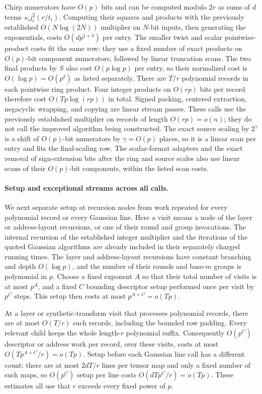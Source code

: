 \documentclass[11pt]{article}
\theoremstyle{definition}
\begin{document}
Chirp numerators have $O(p)$ bits and can be computed modulo $2r$ as
sums of $d$ terms $s_i j_i^2(r/t_i)$.  Computing their squares and
products with the previously established $O(N\log(2N))$ multiplier
on $N$-bit inputs,
then generating the exponentials, costs $O(dp^{1+\delta})$ per entry.
The smaller twist and scalar pointwise-product costs fit the same row:
they use a fixed number of exact products on $O(p)$-bit component
numerators, followed by linear truncation scans.  The two final products
by $S$ also cost $O(p\log p)$ per entry, so their normalized cost is
$O(\log p)=O(p^\delta)$ as listed separately.  There are $T/r$
polynomial records in each pointwise ring product.  Four integer
products on $O(rp)$ bits per record therefore cost
$O(Tp\log(rp))$ in total.  Signed packing, centered extraction,
negacyclic wrapping, and copying are linear stream passes.  These calls
use the previously established multiplier on records of length
$O(rp)=o(n)$; they do not call the improved algorithm being constructed.
The exact source scaling by $2^\gamma$ is a shift of $O(p)$-bit
numerators by $\gamma=O(p)$ places, so it is a linear scan per entry
and fits the final-scaling row. The scalar-format adapters and the exact
removal of sign-extension bits after the ring and source scales also use
linear scans of their $O(p)$-bit components, within the listed scan costs.

\paragraph{Setup and exceptional streams across all calls.}
We next separate setup at recursion nodes from work repeated for every
polynomial record or every Gaussian line.  Here a visit means a node
of the layer or address-layout recursions, or one of their round and
group invocations.  The internal recursion of the established integer
multiplier and the iterations of the quoted Gaussian algorithms are
already included in their separately charged running times.
The layer and address-layout recursions have constant branching and
depth $O(\log p)$, and the number of their rounds and base-$m$ groups
is polynomial in $p$.  Choose a fixed exponent $A$ so that their
total number of visits is at most $p^A$, and a fixed $C$ bounding
descriptor setup performed once per visit by $p^C$ steps.  This setup then
costs at most $p^{A+C}=o(Tp)$.

At a layer or synthetic-transform visit that processes polynomial
records, there are at most $O(T/r)$ such records, including the
bounded row padding.  Every relevant child keeps the whole
length-$r$ polynomial suffix.  Consequently $O(p^C)$ descriptor or
address work per record, over these visits, costs at most
$O(Tp^{A+C}/r)=o(Tp)$.  Setup before each Gaussian line call has a
different count:
there are at most $2dT/r$ lines per tensor map and only a fixed number
of such maps, so $O(p^C)$ setup per line costs
$O(dTp^C/r)=o(Tp)$.  These estimates all use that $r$ exceeds every
fixed power of $p$.
\end{document}
